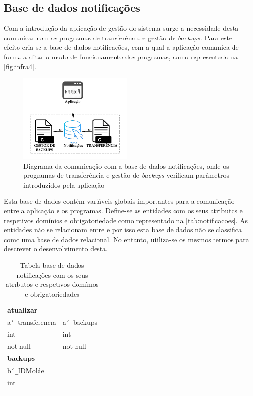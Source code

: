 \documentclass[11pt,twoside,a4paper]{report}
\begin{document}
\subsection{Base de dados notificações}
\label{subchap:notificacoes}
Com a introdução da aplicação de gestão do sistema surge a necessidade desta comunicar com os programas de transferência e gestão de \textit{backups}. Para este efeito cria-se a base de dados notificações, com a qual a aplicação comunica de forma a ditar o modo de funcionamento dos programas, como representado na \autoref{fig:infra4}.
\begin{figure}[H]
	\centering
	\begin{center}
		\includegraphics[width=0.5\textwidth]{Aplicacao_notificacoes} %
		\caption[Diagrama da comunicação com a base de dados notificações]{Diagrama da comunicação com a base de dados notificações, onde os programas de transferência e gestão de \textit{backups} verificam parâmetros introduzidos pela aplicação}
		\label{fig:infra4}
	\end{center}
\end{figure}
Esta base de dados contém variáveis globais importantes para a comunicação entre a aplicação e os programas. Define-se as entidades com os seus atributos e respetivos domínios e obrigatoriedade como representado na \autoref{tab:notificacoes}. As entidades não se relacionam entre e por isso esta base de dados não se classifica como uma base de dados relacional. No entanto, utiliza-se os mesmos termos para descrever o desenvolvimento desta.
\begin{table}[H]
	\centering
	\begin{tabular}{|l|l|}
		\multicolumn{2}{l}{\textbf{atualizar}}\\ \cline{1-2}
		a\texttt{\char`_}transferencia & a\texttt{\char`_}backups\\ \cline{1-2}
		int & int\\ \cline{1-2}
		not null & not null\\ \cline{1-2}
		\multicolumn{2}{l}{\textbf{backups}}\\ \cline{1-1}
		b\texttt{\char`_}IDMolde &\multicolumn{1}{l}{}\\ \cline{1-1}
		int &\multicolumn{1}{l}{}\\ \cline{1-1}
		 &\multicolumn{1}{l}{}\\ \cline{1-1}
	\end{tabular}
	\caption[Tabelas da base de dados notificações com os seus atributos e respetivos domínios e obrigatoriedades]{Tabela base de dados notificações com os seus atributos e respetivos domínios e obrigatoriedades}
	\label{tab:notificacoes}
\end{table}
\end{document}
